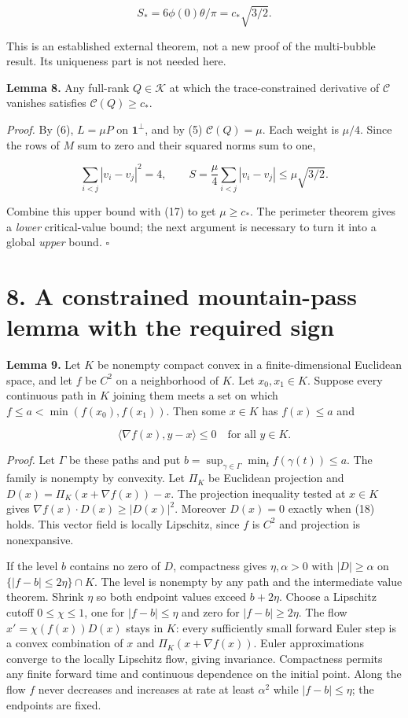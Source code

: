 \documentclass[
  11pt,
]{article}
\begin{document}
\[
 S_* =6\phi(0)\theta/\pi=c_*\sqrt{3/2}.               \tag{17}
\]

This is an established external theorem, not a new proof of the
multi-bubble result. Its uniqueness part is not needed here.

\textbf{Lemma 8.} Any full-rank \(Q\in\mathcal K\) at which the
trace-constrained derivative of \(\mathcal C\) vanishes satisfies
\(\mathcal C(Q)\ge c_*\).

\emph{Proof.} By (6), \(L=\mu P\) on \(\mathbf1^\perp\), and by (5)
\(\mathcal C(Q)=\mu\). Each weight is \(\mu/4\). Since the rows of \(M\)
sum to zero and their squared norms sum to one,

\[
 \sum_{i<j}|v_i-v_j|^2=4,\qquad
 S=\frac\mu4\sum_{i<j}|v_i-v_j|
                 \le\mu\sqrt{3/2}.
\]

Combine this upper bound with (17) to get \(\mu\ge c_*\). The perimeter
theorem gives a \emph{lower} critical-value bound; the next argument is
necessary to turn it into a global \emph{upper} bound. \(\square\)

\section{8. A constrained mountain-pass lemma with the required
sign}\label{a-constrained-mountain-pass-lemma-with-the-required-sign}

\textbf{Lemma 9.} Let \(K\) be nonempty compact convex in a
finite-dimensional Euclidean space, and let \(f\) be \(C^2\) on a
neighborhood of \(K\). Let \(x_0,x_1\in K\). Suppose every continuous
path in \(K\) joining them meets a set on which
\(f\le a<\min(f(x_0),f(x_1))\). Then some \(x\in K\) has \(f(x)\le a\)
and

\[
 \langle\nabla f(x),y-x\rangle\le0\quad\text{for all }y\in K. \tag{18}
\]

\emph{Proof.} Let \(\Gamma\) be these paths and put
\(b=\sup_{\gamma\in\Gamma}\min_t f(\gamma(t))\le a\). The family is
nonempty by convexity. Let \(\Pi_K\) be Euclidean projection and
\(D(x)=\Pi_K(x+\nabla f(x))-x\). The projection inequality tested at
\(x\in K\) gives \(\nabla f(x)\cdot D(x)\ge|D(x)|^2\). Moreover
\(D(x)=0\) exactly when (18) holds. This vector field is locally
Lipschitz, since \(f\) is \(C^2\) and projection is nonexpansive.

If the level \(b\) contains no zero of \(D\), compactness gives
\(\eta,\alpha>0\) with \(|D|\ge\alpha\) on \(\{|f-b|\le2\eta\}\cap K\).
The level is nonempty by any path and the intermediate value theorem.
Shrink \(\eta\) so both endpoint values exceed \(b+2\eta\). Choose a
Lipschitz cutoff \(0\le\chi\le1\), one for \(|f-b|\le\eta\) and zero for
\(|f-b|\ge2\eta\). The flow \(x'=\chi(f(x))D(x)\) stays in \(K\): every
sufficiently small forward Euler step is a convex combination of \(x\)
and \(\Pi_K(x+\nabla f(x))\). Euler approximations converge to the
locally Lipschitz flow, giving invariance. Compactness permits any
finite forward time and continuous dependence on the initial point.
Along the flow \(f\) never decreases and increases at rate at least
\(\alpha^2\) while \(|f-b|\le\eta\); the endpoints are fixed.
\end{document}
